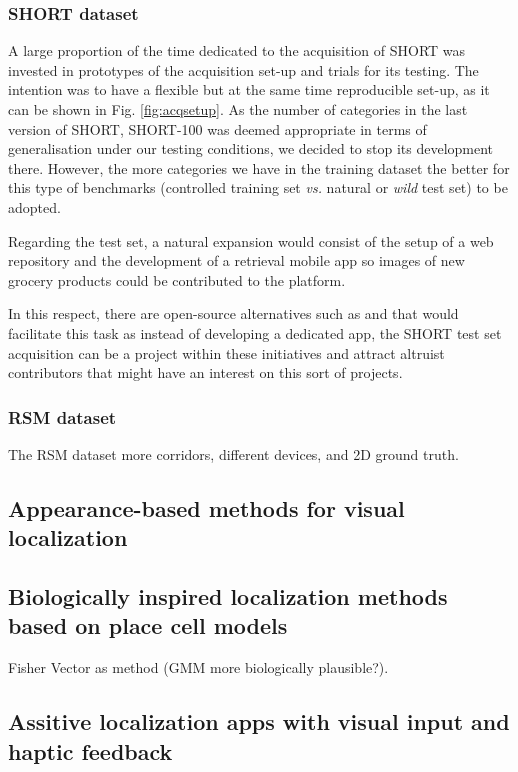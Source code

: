 \subsubsection{SHORT dataset}

A large proportion of the time dedicated to the acquisition of SHORT was invested in prototypes of the acquisition set-up and trials for its testing. The intention was to have a flexible but at the same time reproducible set-up, as it can be shown in Fig. \ref{fig:acqsetup}. As the number of categories in the last version of SHORT, SHORT-100 was deemed appropriate in terms of generalisation under our testing conditions, we decided to stop its development there. However, the more categories we have in the training dataset the better for this type of benchmarks (controlled training set \textit{vs.} natural or \textit{wild} test set) to be adopted.

Regarding the test set, a natural expansion would consist of the setup of a web repository and the development of a retrieval mobile app so images of new grocery products could be contributed to the platform.

In this respect, there are open-source alternatives such as \cite{apple} and \cite{google} that would facilitate this task as instead of developing a dedicated app, the SHORT test set acquisition can be a project within these initiatives and attract altruist contributors that might have an interest on this sort of projects.

\subsubsection{RSM dataset}

The RSM dataset more corridors, different devices, and 2D ground truth.

\subsection{Appearance-based methods for visual localization}

\subsection{Biologically inspired localization methods based on place cell models}
Fisher Vector as method (GMM more biologically plausible?).
\subsection{Assitive localization apps with visual input and haptic feedback}


